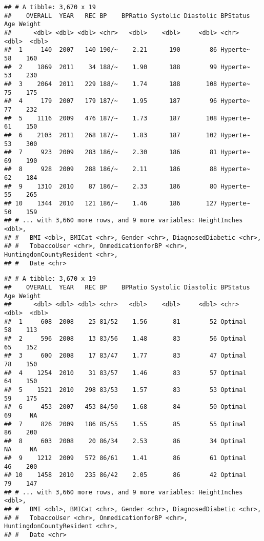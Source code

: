 \documentclass[
]{article}
\newenvironment{Shaded}{\begin{snugshade}}{\end{snugshade}}
\newcommand{\KeywordTok}[1]{\textcolor[rgb]{0.13,0.29,0.53}{\textbf{#1}}}
\newcommand{\NormalTok}[1]{#1}
\newcommand{\OperatorTok}[1]{\textcolor[rgb]{0.81,0.36,0.00}{\textbf{#1}}}
\newcommand{\StringTok}[1]{\textcolor[rgb]{0.31,0.60,0.02}{#1}}
\begin{document}
\begin{verbatim}
## # A tibble: 3,670 x 19
##    OVERALL  YEAR   REC BP    BPRatio Systolic Diastolic BPStatus   Age Weight
##      <dbl> <dbl> <dbl> <chr>   <dbl>    <dbl>     <dbl> <chr>    <dbl>  <dbl>
##  1     140  2007   140 190/~    2.21      190        86 Hyperte~    58    160
##  2    1869  2011    34 188/~    1.90      188        99 Hyperte~    53    230
##  3    2064  2011   229 188/~    1.74      188       108 Hyperte~    75    175
##  4     179  2007   179 187/~    1.95      187        96 Hyperte~    77    232
##  5    1116  2009   476 187/~    1.73      187       108 Hyperte~    61    150
##  6    2103  2011   268 187/~    1.83      187       102 Hyperte~    53    300
##  7     923  2009   283 186/~    2.30      186        81 Hyperte~    69    190
##  8     928  2009   288 186/~    2.11      186        88 Hyperte~    62    184
##  9    1310  2010    87 186/~    2.33      186        80 Hyperte~    55    265
## 10    1344  2010   121 186/~    1.46      186       127 Hyperte~    50    159
## # ... with 3,660 more rows, and 9 more variables: HeightInches <dbl>,
## #   BMI <dbl>, BMICat <chr>, Gender <chr>, DiagnosedDiabetic <chr>,
## #   TobaccoUser <chr>, OnmedicationforBP <chr>, HuntingdonCountyResident <chr>,
## #   Date <chr>
\end{verbatim}

\begin{Shaded}
\end{Shaded}

\begin{verbatim}
## # A tibble: 3,670 x 19
##    OVERALL  YEAR   REC BP    BPRatio Systolic Diastolic BPStatus   Age Weight
##      <dbl> <dbl> <dbl> <chr>   <dbl>    <dbl>     <dbl> <chr>    <dbl>  <dbl>
##  1     608  2008    25 81/52    1.56       81        52 Optimal     58    113
##  2     596  2008    13 83/56    1.48       83        56 Optimal     65    152
##  3     600  2008    17 83/47    1.77       83        47 Optimal     78    150
##  4    1254  2010    31 83/57    1.46       83        57 Optimal     64    150
##  5    1521  2010   298 83/53    1.57       83        53 Optimal     59    175
##  6     453  2007   453 84/50    1.68       84        50 Optimal     69     NA
##  7     826  2009   186 85/55    1.55       85        55 Optimal     86    200
##  8     603  2008    20 86/34    2.53       86        34 Optimal     NA     NA
##  9    1212  2009   572 86/61    1.41       86        61 Optimal     46    200
## 10    1458  2010   235 86/42    2.05       86        42 Optimal     79    147
## # ... with 3,660 more rows, and 9 more variables: HeightInches <dbl>,
## #   BMI <dbl>, BMICat <chr>, Gender <chr>, DiagnosedDiabetic <chr>,
## #   TobaccoUser <chr>, OnmedicationforBP <chr>, HuntingdonCountyResident <chr>,
## #   Date <chr>
\end{verbatim}
\end{document}
